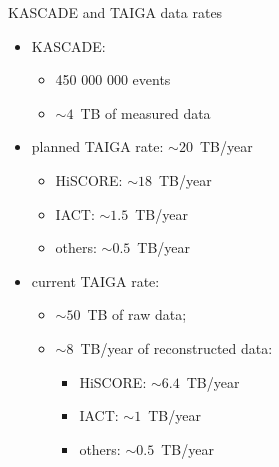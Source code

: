 \begin{frame}{KASCADE and TAIGA data rates}
\begin{minipage}[c]{0.5\textwidth}
  \begin{itemize}
    \item KASCADE:
    \begin{itemize}
      \item 450 000 000 events
      \item $\sim 4$~TB of measured data
    \end{itemize}
    \vspace{2em}
    \item planned TAIGA rate: $\sim 20$~TB/year
    \begin{itemize}
      \item HiSCORE: $\sim 18$~TB/year
      \item IACT: $\sim 1.5$~TB/year
      \item others: $\sim 0.5$~TB/year
    \end{itemize}
  \end{itemize}
\end{minipage}
\hfill
\begin{minipage}[c]{0.49\textwidth}
\vspace{-3.5em}
  \begin{itemize}
    \item current TAIGA rate: 
    \begin{itemize}
      \item $\sim 50$~TB of raw data;
      \item $\sim 8$~TB/year of reconstructed data:
      \begin{itemize}
        \item HiSCORE: $\sim 6.4$~TB/year
        \item IACT: $\sim 1$~TB/year
        \item others: $\sim 0.5$~TB/year
      \end{itemize}
    \end{itemize}
  \end{itemize}
\end{minipage}
\end{frame}

